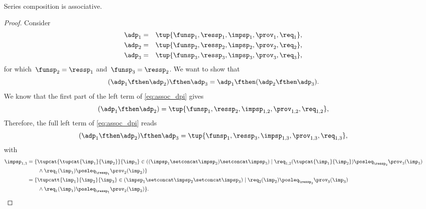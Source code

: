 \begin{lemma}
    Series composition is associative.
\end{lemma}
\begin{proof}
    Consider
    \begin{equation}
        \begin{aligned}
            \adp_{1}&=&\tup{\funsp_{1},\ressp_{1},\impsp_{1},\prov_{1},\req_{1}},\\
            \adp_{2}&=&\tup{\funsp_{2},\ressp_{2},\impsp_{2},\prov_{2},\req_{2}},\\
            \adp_{3}&=&\tup{\funsp_{3},\ressp_{3},\impsp_{3},\prov_{3},\req_{3}},
        \end{aligned}
    \end{equation}
    for which~$\funsp_{2}=\ressp_{1}$ and~$\funsp_{3}=\ressp_{2}$.
    We want to show that
    \begin{equation}
        \label{eq:assoc_dpi}
        (\adp_1\fthen \adp_2)\fthen \adp_3=\adp_1\fthen (\adp_2\fthen \adp_3).
    \end{equation}
    We know that the first part of the left term of \cref{eq:assoc_dpi} gives
    \begin{equation}
    (\adp_{1} \fthen \adp_{2})
        =
        \tup{ \funsp_{1},\ressp_{2},\impsp_{1,2},\prov_{1,2},\req_{1,2}},
    \end{equation}
    Therefore, the full left term of \cref{eq:assoc_dpi} reads
    \begin{equation}
        \label{eq:dpi_ass_1}
        (\adp_{1} \fthen \adp_{2})\fthen \adp_{3}=\tup{ \funsp_{1},\ressp_{3},\impsp_{1,3},\prov_{1,3},\req_{1,3}},
    \end{equation}
    with
    \begin{equation}
        \begin{aligned}
            \impsp_{1,3}  &=  \{  \tupcat {\tupcat {\imp_{1}} {\imp_{2}}} {\imp_{3}} \in ((\impsp_{1} \setconcat \impsp_{2})\setconcat \impsp_{3})\mid\req_{1,2}(\tupcat {\imp_{1}} {\imp_{2}})\posleq_{\ressp_{2}}\prov_{3}(\imp_{3})
            \\
            &\qquad \wedge \req_{1}(\imp_{1})\posleq_{\ressp_1}\prov_2(\imp_2)\}\\
            &=\{  \tupcatt{\imp_{1}}{\imp_{2}}{\imp_{3}} \in (\impsp_{1} \setconcat \impsp_{2}\setconcat \impsp_{3})\mid\req_{2}(\imp_2)\posleq_{\ressp_{2}}\prov_{3}(\imp_{3})\\
            &\qquad \wedge \req_{1}(\imp_{1})\posleq_{\ressp_1}\prov_2(\imp_2)\}.
        \end{aligned}

\end{equation}
\end{proof}
